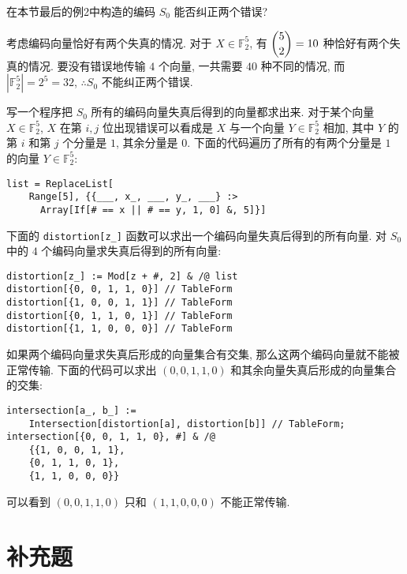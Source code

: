 \documentclass[color=black,device=normal,lang=cn,mode=geye]{elegantnote}
\begin{document}
\begin{exercise}%
    在本节最后的例2中构造的编码 $S_0$ 能否纠正两个错误?
\end{exercise}
\begin{solution}
    考虑编码向量恰好有两个失真的情况. 对于 $X\in \mathbb{F}_2^5$, 有 $\dbinom{5}{2}=10$ 种恰好有两个失真的情况. 要没有错误地传输 $4$ 个向量, 一共需要 $40$ 种不同的情况, 而 $|\mathbb{F}_2^5|=2^5=32$, $\therefore S_0$ 不能纠正两个错误.
\end{solution}
\begin{note}
    写一个程序把 $S_0$ 所有的编码向量失真后得到的向量都求出来. 对于某个向量 $X\in\mathbb{F}_2^5$, $X$ 在第 $i,j$ 位出现错误可以看成是 $X$ 与一个向量 $Y\in\mathbb{F}_2^5$ 相加, 其中 $Y$ 的第 $i$ 和第 $j$ 个分量是 $1$, 其余分量是 $0$. 下面的代码遍历了所有的有两个分量是 $1$ 的向量 $Y\in\mathbb{F}_2^5$:
    \begin{lstlisting}
list = ReplaceList[
    Range[5], {{___, x_, ___, y_, ___} :> 
      Array[If[# == x || # == y, 1, 0] &, 5]}]\end{lstlisting}

    下面的 \verb|distortion[z_]| 函数可以求出一个编码向量失真后得到的所有向量. 对 $S_0$ 中的 $4$ 个编码向量求失真后得到的所有向量:
    \begin{lstlisting}
distortion[z_] := Mod[z + #, 2] & /@ list
distortion[{0, 0, 1, 1, 0}] // TableForm
distortion[{1, 0, 0, 1, 1}] // TableForm
distortion[{0, 1, 1, 0, 1}] // TableForm
distortion[{1, 1, 0, 0, 0}] // TableForm\end{lstlisting}

    如果两个编码向量求失真后形成的向量集合有交集, 那么这两个编码向量就不能被正常传输. 下面的代码可以求出 $(0, 0, 1, 1, 0)$ 和其余向量失真后形成的向量集合的交集:
    \begin{lstlisting}
intersection[a_, b_] :=
    Intersection[distortion[a], distortion[b]] // TableForm;
intersection[{0, 0, 1, 1, 0}, #] & /@
    {{1, 0, 0, 1, 1},
    {0, 1, 1, 0, 1},
    {1, 1, 0, 0, 0}}\end{lstlisting}

    可以看到 $(0, 0, 1, 1, 0)$ 只和 $(1, 1, 0, 0, 0)$ 不能正常传输.
\end{note}
\section{补充题}
\end{document}
